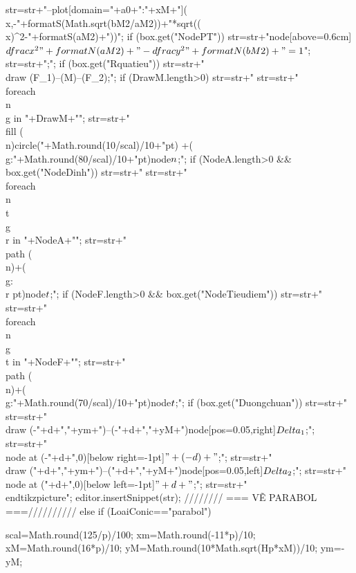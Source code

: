 {{{			str=str+"\n--plot[domain="+a0+":"+xM+"](\\x,{-"+formatS(Math.sqrt(bM2/aM2))+"*sqrt((\\x)^2-"+formatS(aM2)+")})";
			if (box.get("NodePT"))
			str=str+"\n node[above=0.6cm]{$\\dfrac{x^2}{"+formatN(aM2)+"}-\\dfrac{y^2}{"+formatN(bM2)+"}=1$}";
			str=str+";";
			if (box.get("Rquatieu"))
			str=str+"\n\\draw (F_1)--(M)--(F_2);";
			if (DrawM.length>0) {
				str=str+"\n %
				str=str+"\n\\foreach \\n\\g in {"+DrawM+"}";
				str=str+"\n\\fill (\\n)circle("+Math.round(10/scal)/10+"pt) +(\\g:"+Math.round(80/scal)/10+"pt)node{$\\n$};";
			}
			if (NodeA.length>0 && box.get("NodeDinh")) {
				str=str+"\n %
				str=str+"\n\\foreach \\n\\t\\g\\r in {"+NodeA+"}";
				str=str+"\n\\path (\\n)+(\\g:\\r pt)node{$\\t$};";
			}
			if (NodeF.length>0 && box.get("NodeTieudiem")) {
				str=str+"\n %
				str=str+"\n\\foreach \\n\\g\\t in {"+NodeF+"}";
				str=str+"\n\\path (\\n)+(\\g:"+Math.round(70/scal)/10+"pt)node{$\\t$};";
			}
			if (box.get("Duongchuan")) {
				str=str+"\n %
				str=str+"\n\\draw (-"+d+","+ym+")--(-"+d+","+yM+")node[pos=0.05,right]{$\\Delta_1$};";
				str=str+"\n\\node at (-"+d+",0)[below right=-1pt]{$"+(-d)+"$};";
				str=str+"\n\\draw ("+d+","+ym+")--("+d+","+yM+")node[pos=0.05,left]{$\\Delta_2$};";
				str=str+"\n\\node at ("+d+",0)[below left=-1pt]{$"+d+"$};";
			}
			str=str+"\n\\end{tikzpicture}";
			editor.insertSnippet(str);
		}
		//////// === VẼ PARABOL ===//////////
		else if (LoaiConic=="parabol") {
			scal=Math.round(125/p)/100;
			xm=Math.round(-11*p)/10;				xM=Math.round(16*p)/10;
			yM=Math.round(10*Math.sqrt(Hp*xM))/10; 	ym=-yM;
			
}}}
